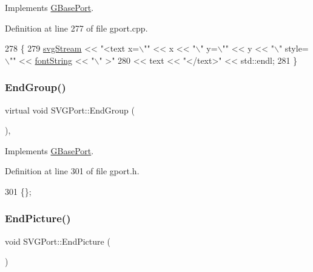 Implements \mbox{\hyperlink{class_g_base_port_a9b947d2575b05f303520fbbe7fd9e350}{G\+Base\+Port}}.



Definition at line 277 of file gport.\+cpp.


\begin{DoxyCode}
278 \{
279     \mbox{\hyperlink{class_s_v_g_port_ad3e240ca528cd784e138dce907d5d45a}{svgStream}} << \textcolor{stringliteral}{"<text x=\(\backslash\)""} << x << \textcolor{stringliteral}{"\(\backslash\)" y=\(\backslash\)""} << y << \textcolor{stringliteral}{"\(\backslash\)" style=\(\backslash\)""} << 
      \mbox{\hyperlink{class_s_v_g_port_a84d591ffe687b48a18ef8dbfebe9bce4}{fontString}} << \textcolor{stringliteral}{"\(\backslash\)" >"}
280             << text << \textcolor{stringliteral}{"</text>"} << std::endl;
281 \}
\end{DoxyCode}
\mbox{\label{class_s_v_g_port_a169f01fd03ef513e6d19df2ceb29234b}} 
\subsubsection{\texorpdfstring{End\+Group()}{EndGroup()}}
{\footnotesize\ttfamily virtual void S\+V\+G\+Port\+::\+End\+Group (\begin{DoxyParamCaption}{ }\end{DoxyParamCaption})\hspace{0.3cm}{\ttfamily [inline]}, {\ttfamily [virtual]}}



Implements \mbox{\hyperlink{class_g_base_port_aa5b444d85d6bf8c88bbddb58f7ce8bd4}{G\+Base\+Port}}.



Definition at line 301 of file gport.\+h.


\begin{DoxyCode}
301 \{\};
\end{DoxyCode}
\mbox{\label{class_s_v_g_port_a564266843879b682d84b9aefad185662}} 
\subsubsection{\texorpdfstring{End\+Picture()}{EndPicture()}}
{\footnotesize\ttfamily void S\+V\+G\+Port\+::\+End\+Picture (\begin{DoxyParamCaption}{ }\end{DoxyParamCaption})\hspace{0.3cm}{\ttfamily [virtual]}}



